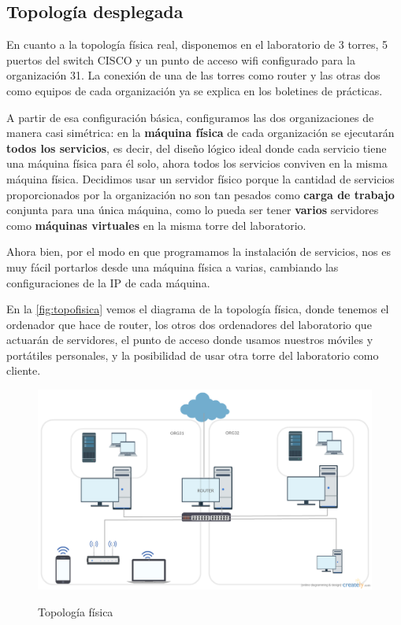 \documentclass[]{article}
\begin{document}
\subsection{Topología desplegada}

En cuanto a la topología física real, disponemos en el laboratorio de 3 torres, 5 puertos del switch CISCO y un punto de acceso wifi configurado para la organización 31. La conexión de una de las torres como router y las otras dos como equipos de cada organización ya se explica en los boletines de prácticas.

A partir de esa configuración básica, configuramos las dos organizaciones de manera casi simétrica: en la \textbf{máquina física} de cada organización se ejecutarán \textbf{todos los servicios}, es decir, del diseño lógico ideal donde cada servicio tiene una máquina física para él solo, ahora todos los servicios conviven en la misma máquina física. Decidimos usar un servidor físico porque la cantidad de servicios proporcionados por la organización no son tan pesados como \textbf{carga de trabajo} conjunta para una única máquina, como lo pueda ser tener \textbf{varios} servidores como \textbf{máquinas virtuales} en la misma torre del laboratorio.

Ahora bien, por el modo en que programamos la instalación de servicios, nos es muy fácil portarlos desde una máquina física a varias, cambiando las configuraciones de la IP de cada máquina.

En la \autoref{fig:topofisica} vemos el diagrama de la topología física, donde tenemos el ordenador que hace de router, los otros dos ordenadores del laboratorio que actuarán de servidores, el punto de acceso donde usamos nuestros móviles y portátiles personales, y la posibilidad de usar otra torre del laboratorio como cliente.


\begin{figure}[h!]
	\caption{Topología física}
	\centering
		\includegraphics[scale=0.35]{images/TopologiaFisica}
	\label{fig:topofisica}
\end{figure}
\end{document}
